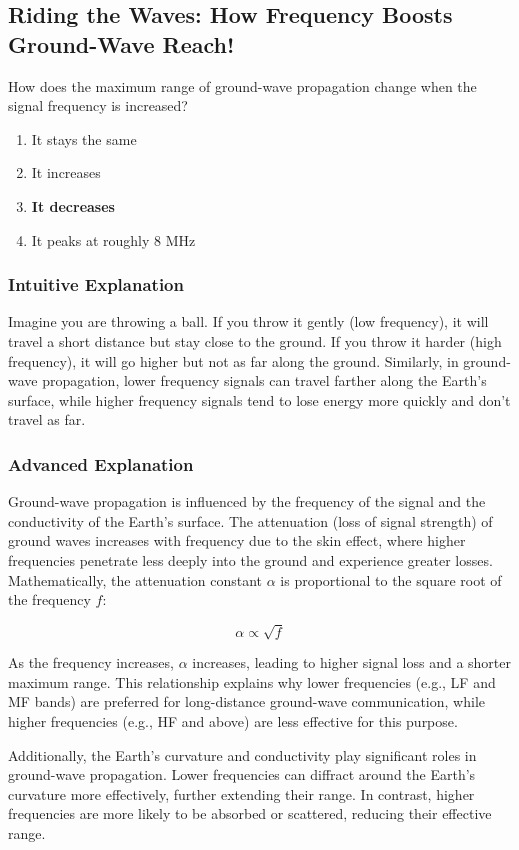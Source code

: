 \subsection{Riding the Waves: How Frequency Boosts Ground-Wave Reach!}

\begin{tcolorbox}[colback=gray!10!white,colframe=black!75!black,title=E3B08] How does the maximum range of ground-wave propagation change when the signal frequency is increased?
    \begin{enumerate}[label=\Alph*.]
        \item It stays the same
        \item It increases
        \item \textbf{It decreases}
        \item It peaks at roughly 8 MHz
    \end{enumerate}
\end{tcolorbox}

\subsubsection*{Intuitive Explanation}
Imagine you are throwing a ball. If you throw it gently (low frequency), it will travel a short distance but stay close to the ground. If you throw it harder (high frequency), it will go higher but not as far along the ground. Similarly, in ground-wave propagation, lower frequency signals can travel farther along the Earth's surface, while higher frequency signals tend to lose energy more quickly and don't travel as far.

\subsubsection*{Advanced Explanation}
Ground-wave propagation is influenced by the frequency of the signal and the conductivity of the Earth's surface. The attenuation (loss of signal strength) of ground waves increases with frequency due to the skin effect, where higher frequencies penetrate less deeply into the ground and experience greater losses. Mathematically, the attenuation constant \(\alpha\) is proportional to the square root of the frequency \(f\):

\[
\alpha \propto \sqrt{f}
\]

As the frequency increases, \(\alpha\) increases, leading to higher signal loss and a shorter maximum range. This relationship explains why lower frequencies (e.g., LF and MF bands) are preferred for long-distance ground-wave communication, while higher frequencies (e.g., HF and above) are less effective for this purpose.

Additionally, the Earth's curvature and conductivity play significant roles in ground-wave propagation. Lower frequencies can diffract around the Earth's curvature more effectively, further extending their range. In contrast, higher frequencies are more likely to be absorbed or scattered, reducing their effective range.

